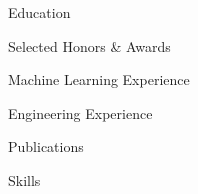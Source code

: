 \documentclass[11pt]{resume}
\begin{document}
\begin{rSection}{Education}
\end{rSection}

\begin{rSection}{Selected Honors \& Awards}
\end{rSection}

\begin{rSection}{Machine Learning Experience}
\end{rSection}

\begin{rSection}{Engineering Experience}
\end{rSection}



\begin{rSection}{Publications}
\end{rSection}

\begin{rSection}{Skills}
\end{rSection}
\end{document}
